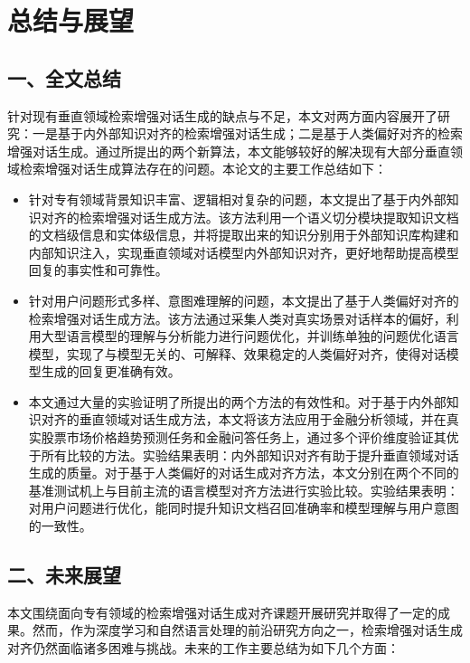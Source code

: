 \chapter{总结与展望}

\section*{一、全文总结}

针对现有垂直领域检索增强对话生成的缺点与不足，本文对两方面内容展开了研究：一是基于内外部知识对齐的检索增强对话生成；二是基于人类偏好对齐的检索增强对话生成。通过所提出的两个新算法，本文能够较好的解决现有大部分垂直领域检索增强对话生成算法存在的问题。本论文的主要工作总结如下：

\begin{itemize}[topsep = 0 pt, itemsep= 0 pt, parsep=0pt, partopsep=0pt, leftmargin=20pt, itemindent=0pt, labelsep=6pt, listparindent=24pt]
	\item 针对专有领域背景知识丰富、逻辑相对复杂的问题，本文提出了基于内外部知识对齐的检索增强对话生成方法。该方法利用一个语义切分模块提取知识文档的文档级信息和实体级信息，并将提取出来的知识分别用于外部知识库构建和内部知识注入，实现垂直领域对话模型内外部知识对齐，更好地帮助提高模型回复的事实性和可靠性。

	\item 针对用户问题形式多样、意图难理解的问题，本文提出了基于人类偏好对齐的检索增强对话生成方法。该方法通过采集人类对真实场景对话样本的偏好，利用大型语言模型的理解与分析能力进行问题优化，并训练单独的问题优化语言模型，实现了与模型无关的、可解释、效果稳定的人类偏好对齐，使得对话模型生成的回复更准确有效。
	
    \item 本文通过大量的实验证明了所提出的两个方法的有效性和。对于基于内外部知识对齐的垂直领域对话生成方法，本文将该方法应用于金融分析领域，并在真实股票市场价格趋势预测任务和金融问答任务上，通过多个评价维度验证其优于所有比较的方法。实验结果表明：内外部知识对齐有助于提升垂直领域对话生成的质量。对于基于人类偏好的对话生成对齐方法，本文分别在两个不同的基准测试机上与目前主流的语言模型对齐方法进行实验比较。实验结果表明：对用户问题进行优化，能同时提升知识文档召回准确率和模型理解与用户意图的一致性。
\end{itemize}

\section*{二、未来展望}

本文围绕面向专有领域的检索增强对话生成对齐课题开展研究并取得了一定的成果。然而，作为深度学习和自然语言处理的前沿研究方向之一，检索增强对话生成对齐仍然面临诸多困难与挑战。未来的工作主要总结为如下几个方面：

